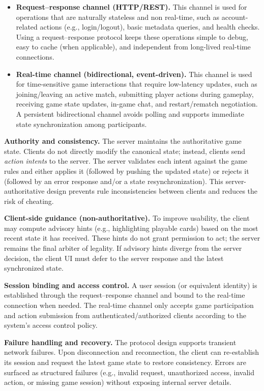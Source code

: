 \documentclass[12pt, titlepage]{article}
\begin{document}
\begin{itemize}
  \item \textbf{Request--response channel (HTTP/REST).}
  This channel is used for operations that are naturally stateless and non real-time, such as account-related actions (e.g., login/logout), basic metadata queries, and health checks.
  Using a request--response protocol keeps these operations simple to debug, easy to cache (when applicable), and independent from long-lived real-time connections.

  \item \textbf{Real-time channel (bidirectional, event-driven).}
  This channel is used for time-sensitive game interactions that require low-latency updates, such as joining/leaving an active match, submitting player actions during gameplay, receiving game state updates, in-game chat, and restart/rematch negotiation.
  A persistent bidirectional channel avoids polling and supports immediate state synchronization among participants.
\end{itemize}

\noindent \textbf{Authority and consistency.}
The server maintains the authoritative game state.
Clients do not directly modify the canonical state; instead, clients send \emph{action intents} to the server.
The server validates each intent against the game rules and either applies it (followed by pushing the updated state) or rejects it (followed by an error response and/or a state resynchronization).
This server-authoritative design prevents rule inconsistencies between clients and reduces the risk of cheating.

\noindent \textbf{Client-side guidance (non-authoritative).}
To improve usability, the client may compute advisory hints (e.g., highlighting playable cards) based on the most recent state it has received.
These hints do not grant permission to act; the server remains the final arbiter of legality.
If advisory hints diverge from the server decision, the client UI must defer to the server response and the latest synchronized state.

\noindent \textbf{Session binding and access control.}
A user session (or equivalent identity) is established through the request--response channel and bound to the real-time connection when needed.
The real-time channel only accepts game participation and action submission from authenticated/authorized clients according to the system's access control policy.

\noindent \textbf{Failure handling and recovery.}
The protocol design supports transient network failures.
Upon disconnection and reconnection, the client can re-establish its session and request the latest game state to restore consistency.
Errors are surfaced as structured failures (e.g., invalid request, unauthorized access, invalid action, or missing game session) without exposing internal server details.
\end{document}
